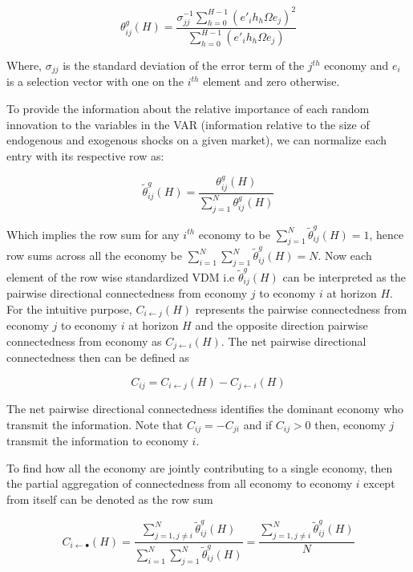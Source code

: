 \documentclass[]{elsarticle} %
\begin{document}
\[\theta _{ij}^{g}\left( H \right)=\frac{\sigma _{jj}^{-1}\sum\nolimits_{h=0}^{H-1}{{{\left( {{{{e}'}}_{i}}{{h}_{h}}\Omega {{e}_{j}} \right)}^{2}}}}{\sum\nolimits_{h=0}^{H-1}{\left( {{{{e}'}}_{i}}{{h}_{h}}\Omega {{e}_{j}} \right)}}\]

Where, \({{\sigma }_{jj}}\) is the standard deviation of the error term
of the \({{j}^{th}}\) economy and \({{e}_{i}}\) is a selection vector
with one on the \({{i}^{th}}\) element and zero otherwise.

To provide the information about the relative importance of each random
innovation to the variables in the VAR (information relative to the size
of endogenous and exogenous shocks on a given market), we can normalize
each entry with its respective row as:

\[\tilde{\theta }_{ij}^{g}\left( H \right)=\frac{\theta _{ij}^{g}\left( H \right)}{\sum\nolimits_{j=1}^{N}{\theta _{ij}^{g}\left( H \right)}}\]

Which implies the row sum for any \({{i}^{th}}\) economy to be
\(\sum\nolimits_{j=1}^{N}{\tilde{\theta }_{ij}^{g}\left( H \right)}=1\),
hence row sums across all the economy be
\(\sum\nolimits_{i=1}^{N}{\sum\nolimits_{j=1}^{N}{\tilde{\theta }_{ij}^{g}\left( H \right)}}=N\).
Now each element of the row wise standardized VDM i.e
\({\tilde \theta _{ij}^g\left( H \right)}\) can be interpreted as the
pairwise directional connectedness from economy \(j\) to economy \(i\)
at horizon \(H\). For the intuitive purpose,
\({{C}_{i\leftarrow j}}\left( H \right)\) represents the pairwise
connectedness from economy \(j\) to economy \(i\) at horizon \(H\) and
the opposite direction pairwise connectedness from economy as
\({{C}_{j\leftarrow i}}\left( H \right)\). The net pairwise directional
connectedness then can be defined as

\[{{C}_{ij}}={{C}_{i\leftarrow j}}\left( H \right)-{{C}_{j\leftarrow i}}\left( H \right)\]

The net pairwise directional connectedness identifies the dominant
economy who transmit the information. Note that
\({{C}_{ij}}=-{{C}_{ji}}\) and if \({{C}_{ij}}>0\) then, economy
\(j\)transmit the information to economy \(i\).

To find how all the economy are jointly contributing to a single
economy, then the partial aggregation of connectedness from all economy
to economy \(i\) except from itself can be denoted as the row sum

\[{{C}_{i\leftarrow \bullet }}\left( H \right)=\frac{\sum\nolimits_{j=1,j\ne i}^{N}{\tilde{\theta }_{ij}^{g}\left( H \right)}}{\sum\nolimits_{i=1}^{N}{\sum\nolimits_{j=1}^{N}{\tilde{\theta }_{ij}^{g}\left( H \right)}}}=\frac{\sum\nolimits_{j=1,j\ne i}^{N}{\tilde{\theta }_{ij}^{g}\left( H \right)}}{N}\]
\end{document}
